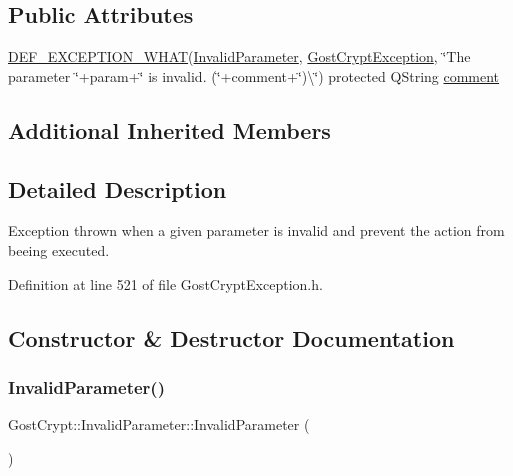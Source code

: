 \subsection*{Public Attributes}
\begin{DoxyCompactItemize}
\item 
\hyperlink{_gost_crypt_exception_8h_a5bc1e1c6c9d6f46c84eeba49e33355f9}{D\+E\+F\+\_\+\+E\+X\+C\+E\+P\+T\+I\+O\+N\+\_\+\+W\+H\+AT}(\hyperlink{class_gost_crypt_1_1_invalid_parameter}{Invalid\+Parameter}, \hyperlink{class_gost_crypt_1_1_gost_crypt_exception}{Gost\+Crypt\+Exception}, \char`\"{}The parameter \char`\"{}+param+\char`\"{} is invalid. (\char`\"{}+comment+\char`\"{})\textbackslash{}\char`\"{}) protected Q\+String \hyperlink{class_gost_crypt_1_1_invalid_parameter_a14b79c4ad8724b8df63669bb2c2e7ed0}{comment}
\end{DoxyCompactItemize}
\subsection*{Additional Inherited Members}


\subsection{Detailed Description}
Exception thrown when a given parameter is invalid and prevent the action from beeing executed. 

Definition at line 521 of file Gost\+Crypt\+Exception.\+h.



\subsection{Constructor \& Destructor Documentation}
\mbox{\label{class_gost_crypt_1_1_invalid_parameter_ab6fc69b27998950f3637f2ba30133825}} 
\subsubsection{\texorpdfstring{Invalid\+Parameter()}{InvalidParameter()}\hspace{0.1cm}{\footnotesize\ttfamily [1/2]}}
{\footnotesize\ttfamily Gost\+Crypt\+::\+Invalid\+Parameter\+::\+Invalid\+Parameter (\begin{DoxyParamCaption}{ }\end{DoxyParamCaption})\hspace{0.3cm}{\ttfamily [inline]}}



